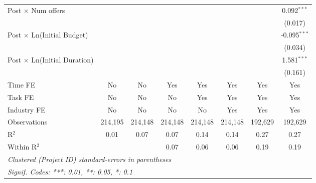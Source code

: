 \documentclass[
]{article}
\begin{document}
\begin{tabular}{lccccccc}
   Post $\times$ Num offers                             &                &                &                &                &                &                & 0.092$^{***}$\\   
                                                        &                &                &                &                &                &                & (0.017)\\   
   Post $\times$ Ln(Initial Budget)                     &                &                &                &                &                &                & -0.095$^{***}$\\   
                                                        &                &                &                &                &                &                & (0.034)\\   
   Post $\times$ Ln(Initial Duration)                   &                &                &                &                &                &                & 1.581$^{***}$\\   
                                                        &                &                &                &                &                &                & (0.161)\\   
   Time FE                                              & No             & No             & Yes            & Yes            & Yes            & Yes            & Yes\\  
   Task FE                                              & No             & No             & No             & Yes            & Yes            & Yes            & Yes\\  
   Industry FE                                          & No             & No             & No             & No             & Yes            & Yes            & Yes\\  
   Observations                                         & 214,195        & 214,148        & 214,148        & 214,148        & 214,148        & 192,629        & 192,629\\  
   R$^2$                                                & 0.01           & 0.07           & 0.07           & 0.14           & 0.14           & 0.27           & 0.27\\  
   Within R$^2$                                         &                &                & 0.07           & 0.06           & 0.06           & 0.19           & 0.19\\  
   \midrule
   \multicolumn{8}{l}{\emph{Clustered (Project ID) standard-errors in parentheses}}\\
   \multicolumn{8}{l}{\emph{Signif. Codes: ***: 0.01, **: 0.05, *: 0.1}}\\
\end{tabular}
\par\endgroup
\end{document}
